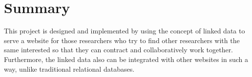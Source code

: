 \section{Summary}
\label{sec:summary}

This project is designed and implemented by using the concept of linked data to serve a website for those researchers who try to find other researchers with the same interested so that they can contract and collaboratively work together. Furthermore, the linked data also can be integrated with other websites in such a way, unlike traditional relational databases.
